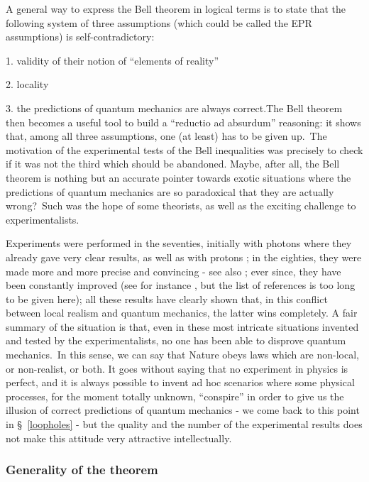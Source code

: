 \documentclass[12pt,onecolumn]{article}%
\begin{document}
A general way to express the Bell theorem in logical terms is to state that
the following system of three assumptions (which could be called the EPR
assumptions) is self-contradictory:

1. validity of their notion of ``elements of reality''

2. locality

3. the predictions of quantum mechanics are always correct.\newline The Bell
theorem then becomes a useful tool to build a ``reductio ad absurdum''
reasoning: it shows that, among all three assumptions, one (at least) has to
be given up.\ The motivation of the experimental tests of the Bell
inequalities was precisely to check if it was not the third which should be
abandoned. Maybe, after all, the Bell theorem is nothing but an accurate
pointer towards exotic situations where the predictions of quantum mechanics
are so paradoxical that they are actually wrong?\ Such was the hope of some
theorists, as well as the exciting challenge to experimentalists.

Experiments were performed in the seventies, initially with photons
\cite{Clauser} \cite{Fry} where they already gave very clear results, as well
as with protons \cite{Lamehi}; in the eighties, they were made more and more
precise and convincing \cite{Aspect} - see also \cite{Kleinpoppen}; ever
since, they have been constantly improved (see for instance \cite{parametric},
but the list of references is too long to be given here); all these results
have clearly shown that, in this conflict between local realism and quantum
mechanics, the latter wins completely. A fair summary of the situation is
that, even in these most intricate situations invented and tested by the
experimentalists, no one has been able to disprove quantum mechanics.\ In this
sense, we can say that Nature obeys laws which are non-local, or non-realist,
or both. It goes without saying that no experiment in physics is perfect, and
it is always possible to invent ad hoc scenarios where some physical
processes, for the moment totally unknown, ``conspire'' in order to give us
the illusion of correct predictions of quantum mechanics - we come back to
this point in \S \ \ref{loopholes} - but the quality and the number of the
experimental results does not make this attitude very attractive intellectually.

\subsubsection{Generality of the theorem}
\end{document}
